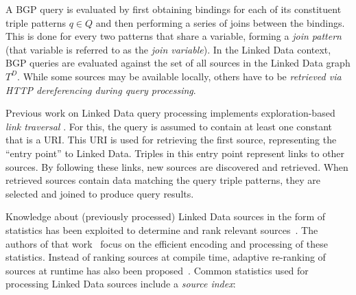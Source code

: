 A BGP query is evaluated by first obtaining bindings for each of its
constituent triple patterns $q \in Q$ and then performing a series of
joins between the bindings. This is done for every two patterns that
share a variable, forming a \emph{join pattern} (that variable is
referred to as the \emph{join variable}).
In the Linked Data context, BGP queries are 
evaluated against the set of all sources in the Linked Data graph $T^D$. 
While some sources may be available locally, others have
to be \emph{retrieved via HTTP dereferencing during query processing}. 

Previous work on Linked Data query processing
implements exploration-based \emph{link traversal} 
\cite{hartig_executing_2009,hartig_zero_2011}. 
For this, the query is assumed to contain at least one constant that
is a URI. This URI is used for retrieving the first source,
representing the ``entry point'' to Linked Data. Triples in this entry
point represent links to other sources. By following these links, new
sources are discovered and retrieved. When retrieved sources contain
data matching the query triple patterns, they are selected and joined
to produce query results.

Knowledge about (previously processed) Linked Data sources in the form of statistics has been exploited 
to determine and rank relevant sources~\cite{harth_data_2010}. 
The authors of that work~\cite{harth_data_2010} focus on the efficient
encoding and processing of these statistics. Instead of ranking
sources at compile time, adaptive re-ranking of sources at runtime has
also been proposed~\cite{ladwig_linked_2010}. Common statistics used
for processing Linked Data sources include a \emph{source index}:


